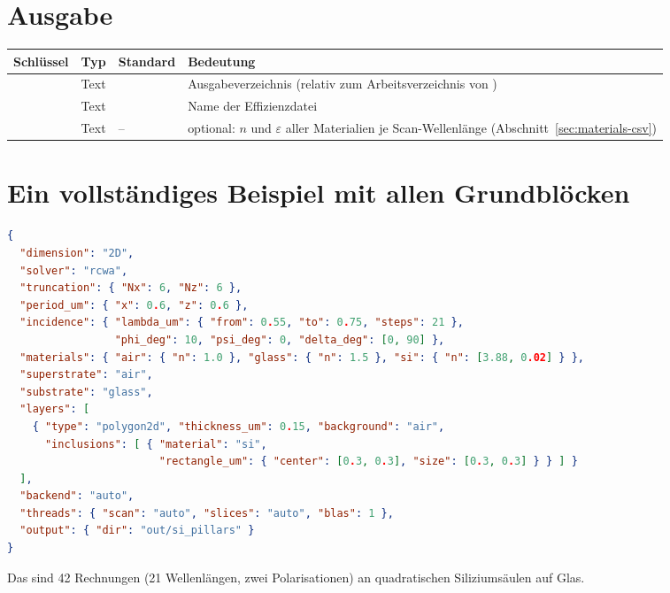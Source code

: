 \section{Ausgabe}
\begin{center}
\small
\begin{tabularx}{\linewidth}{lllY}
\toprule
Schlüssel & Typ & Standard & Bedeutung \\
\midrule
{} & Text &  & Ausgabeverzeichnis (relativ zum Arbeitsverzeichnis von ) \\
 & Text &  & Name der Effizienzdatei \\
 & Text & -- & optional: $n$ und $\varepsilon$ aller Materialien je Scan-Wellenlänge
(Abschnitt~\ref{sec:materials-csv}) \\
\bottomrule
\end{tabularx}
\end{center}

\section{Ein vollständiges Beispiel mit allen Grundblöcken}
\begin{lstlisting}[language=json]
{
  "dimension": "2D",
  "solver": "rcwa",
  "truncation": { "Nx": 6, "Nz": 6 },
  "period_um": { "x": 0.6, "z": 0.6 },
  "incidence": { "lambda_um": { "from": 0.55, "to": 0.75, "steps": 21 },
                 "phi_deg": 10, "psi_deg": 0, "delta_deg": [0, 90] },
  "materials": { "air": { "n": 1.0 }, "glass": { "n": 1.5 }, "si": { "n": [3.88, 0.02] } },
  "superstrate": "air",
  "substrate": "glass",
  "layers": [
    { "type": "polygon2d", "thickness_um": 0.15, "background": "air",
      "inclusions": [ { "material": "si",
                        "rectangle_um": { "center": [0.3, 0.3], "size": [0.3, 0.3] } } ] }
  ],
  "backend": "auto",
  "threads": { "scan": "auto", "slices": "auto", "blas": 1 },
  "output": { "dir": "out/si_pillars" }
}
\end{lstlisting}
Das sind 42 Rechnungen (21 Wellenlängen, zwei Polarisationen) an quadratischen Siliziumsäulen auf Glas.
